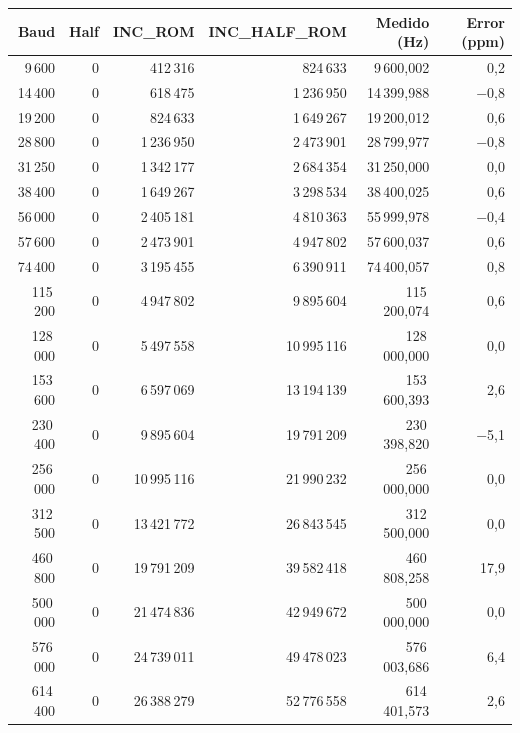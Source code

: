 \begin{table}[H]
    \centering
    \small
    \begin{tabular}{rrrrrr}
        \hline
        \textbf{Baud} & \textbf{Half} & \textbf{INC\_ROM} & \textbf{INC\_HALF\_ROM} & \textbf{Medido (Hz)} & \textbf{Error (ppm)} \\
        \hline
        9\,600   & 0 & 412\,316    & 824\,633    & 9\,600,002    & 0,2 \\
        14\,400  & 0 & 618\,475    & 1\,236\,950   & 14\,399,988   & $-$0,8 \\
        19\,200  & 0 & 824\,633    & 1\,649\,267   & 19\,200,012   & 0,6 \\
        28\,800  & 0 & 1\,236\,950   & 2\,473\,901   & 28\,799,977   & $-$0,8 \\
        31\,250  & 0 & 1\,342\,177   & 2\,684\,354   & 31\,250,000   & 0,0 \\
        38\,400  & 0 & 1\,649\,267   & 3\,298\,534   & 38\,400,025   & 0,6 \\
        56\,000  & 0 & 2\,405\,181   & 4\,810\,363   & 55\,999,978   & $-$0,4 \\
        57\,600  & 0 & 2\,473\,901   & 4\,947\,802   & 57\,600,037   & 0,6 \\
        74\,400  & 0 & 3\,195\,455   & 6\,390\,911   & 74\,400,057   & 0,8 \\
        115\,200 & 0 & 4\,947\,802   & 9\,895\,604   & 115\,200,074  & 0,6 \\
        128\,000 & 0 & 5\,497\,558   & 10\,995\,116  & 128\,000,000  & 0,0 \\
        153\,600 & 0 & 6\,597\,069   & 13\,194\,139  & 153\,600,393  & 2,6 \\
        230\,400 & 0 & 9\,895\,604   & 19\,791\,209  & 230\,398,820  & $-$5,1 \\
        256\,000 & 0 & 10\,995\,116  & 21\,990\,232  & 256\,000,000  & 0,0 \\
        312\,500 & 0 & 13\,421\,772  & 26\,843\,545  & 312\,500,000  & 0,0 \\
        460\,800 & 0 & 19\,791\,209  & 39\,582\,418  & 460\,808,258  & 17,9 \\
        500\,000 & 0 & 21\,474\,836  & 42\,949\,672  & 500\,000,000  & 0,0 \\
        576\,000 & 0 & 24\,739\,011  & 49\,478\,023  & 576\,003,686  & 6,4 \\
        614\,400 & 0 & 26\,388\,279  & 52\,776\,558  & 614\,401,573  & 2,6 \\

\end{tabular}
\end{table}
